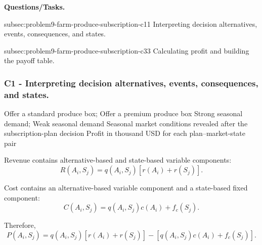 	\textbf{Questions/Tasks.}
	\begin{enumerate}
		\CriterionTask
		{subsec:problem9-farm-produce-subscription-c1}{1}
		{Interpreting decision alternatives, events, consequences, and states.}

		\CriterionTask
		{subsec:problem9-farm-produce-subscription-c3}{3}
		{Calculating profit and building the payoff table.}
	\end{enumerate}

	\subsubsection*{C1 - Interpreting decision alternatives, events, consequences, and states.}
	\label{subsec:problem9-farm-produce-subscription-c1}

	\DecisionElementsTable
	{Offer a standard produce box; Offer a premium produce box}
	{Strong seasonal demand; Weak seasonal demand}
	{Seasonal market conditions revealed after the subscription-plan decision}
	{Profit in thousand USD for each plan--market-state pair}

	Revenue contains alternative-based and state-based variable components:
	\[
	R(A_i,S_j)
	=
	q(A_i,S_j)
	\left[
	r(A_i)+r(S_j)
	\right].
	\]

	Cost contains an alternative-based variable component and a state-based
	fixed component:
	\[
	C(A_i,S_j)
	=
	q(A_i,S_j)c(A_i)+f_c(S_j).
	\]

	Therefore,
	\[
	P(A_i,S_j)
	=
	q(A_i,S_j)
	\left[
	r(A_i)+r(S_j)
	\right]
	-
	\left[
	q(A_i,S_j)c(A_i)+f_c(S_j)
	\right].
	\]


